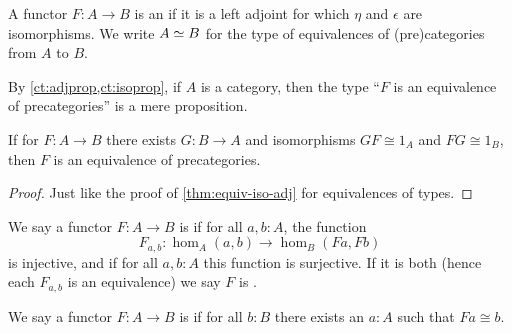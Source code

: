 \begin{defn}\label{ct:equiv}
  A functor $F:A\to B$ is an 
  if it is a left adjoint for which $\eta$ and $\epsilon$ are isomorphisms.
  We write $A \simeq B$ for the type of equivalences of (pre)categories from $A$ to $B$.
\end{defn}

By \cref{ct:adjprop,ct:isoprop}, if $A$ is a category, then the type ``$F$ is an equivalence of precategories'' is a mere proposition.

\begin{lem}\label{ct:adjointification}
  If for $F:A\to B$ there exists $G:B\to A$ and isomorphisms $GF\cong 1_A$ and $FG\cong 1_B$, then $F$ is an equivalence of precategories.
\end{lem}
\begin{proof}
  Just like the proof of \cref{thm:equiv-iso-adj} for equivalences of types.
\end{proof}

\begin{defn}\label{ct:full-faithful}
  We say a functor $F:A\to B$ is 
  if for all $a,b:A$, the function
  \[F_{a,b}:\hom_A(a,b) \to \hom_B(Fa,Fb)\]
  is injective, and 
  if for all $a,b:A$ this function is surjective.
  If it is both (hence each $F_{a,b}$ is an equivalence) we say $F$ is .
\end{defn}

\begin{defn}\label{ct:split-essentially-surjective}
  We say a functor $F:A\to B$ is 
  if for all $b:B$ there exists an $a:A$ such that $Fa\cong b$.
\end{defn}

